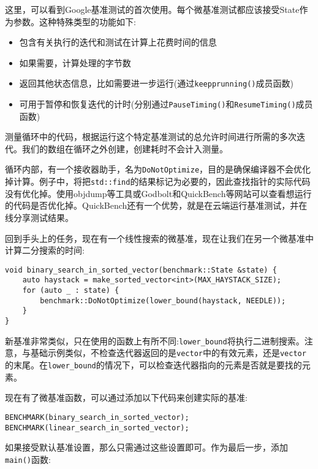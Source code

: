 这里，可以看到Google基准测试的首次使用。每个微基准测试都应该接受State作为参数。这种特殊类型的功能如下:

\begin{itemize}
\item 
包含有关执行的迭代和测试在计算上花费时间的信息

\item 
如果需要，计算处理的字节数

\item 
返回其他状态信息，比如需要进一步运行(通过\texttt{keepprunning()}成员函数)

\item 
可用于暂停和恢复迭代的计时(分别通过\texttt{PauseTiming()}和\texttt{ResumeTiming()}成员函数)
\end{itemize}

测量循环中的代码，根据运行这个特定基准测试的总允许时间进行所需的多次迭代。我们的数组在循环之外创建，创建耗时不会计入测量。 

循环内部，有一个接收器助手，名为\texttt{DoNotOptimize}，目的是确保编译器不会优化掉计算。例子中，将把\texttt{std::find}的结果标记为必要的，因此查找指针的实际代码没有优化掉。使用objdump等工具或Godbolt和QuickBench等网站可以查看想运行的代码是否优化掉。QuickBench还有一个优势，就是在云端运行基准测试，并在线分享测试结果。

回到手头上的任务，现在有一个线性搜索的微基准，现在让我们在另一个微基准中计算二分搜索的时间:

\begin{lstlisting}[style=styleCXX]
void binary_search_in_sorted_vector(benchmark::State &state) {
	auto haystack = make_sorted_vector<int>(MAX_HAYSTACK_SIZE);
	for (auto _ : state) {
		benchmark::DoNotOptimize(lower_bound(haystack, NEEDLE));
	}
}
\end{lstlisting}

新基准非常类似，只在使用的函数上有所不同:\texttt{lower\_bound}将执行二进制搜索。注意，与基础示例类似，不检查迭代器返回的是\texttt{vector}中的有效元素，还是\texttt{vector}的末尾。在\texttt{lower\_bound}的情况下，可以检查迭代器指向的元素是否就是要找的元素。

现在有了微基准函数，可以通过添加以下代码来创建实际的基准:

\begin{lstlisting}[style=styleCXX]
BENCHMARK(binary_search_in_sorted_vector);
BENCHMARK(linear_search_in_sorted_vector);
\end{lstlisting}

如果接受默认基准设置，那么只需通过这些设置即可。作为最后一步，添加\texttt{main()}函数:

